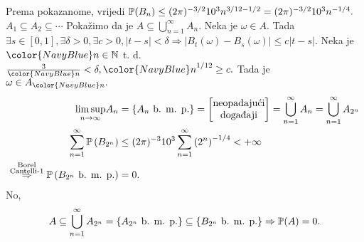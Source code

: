 \documentclass{article}
\begin{document}
Prema pokazanome, vrijedi \(\Bbb P(B_n)\le(2\pi)^{-3/2}10^3n^{3/12-1/2}=(2\pi)^{-3/2}10^3n^{-1/4}.\)\newline \(A_1\subseteq A_2\subseteq\cdots\) Pokažimo da je \(A\subseteq\bigcup_{n=1}^\infty A_n.\) Neka je \(\omega\in A.\) Tada \(\exists s\in[0,1],\exists\delta>0,\exists c>0,|t-s|<\delta\Rightarrow|B_t(\omega)-B_s(\omega)|\le c|t-s|.\) Neka je \({\color{NavyBlue}n}\in\Bbb N\) t. d. \(\frac3{\color{NavyBlue}n}<\delta,{\color{NavyBlue}n}^{1/12}\ge c.\) Tada je \(\omega\in A_{\color{NavyBlue}n}.\) \[\begin{aligned}\underset{n\to\infty}{\lim\sup}A_n&=\left\{A_n\text{ b. m. p.}\right\}=\begin{bmatrix}\text{neopadajući}\\\text{doga\dj{}aji}\end{bmatrix}=\bigcup_{n=1}^\infty A_n=\bigcup_{n=1}^\infty A_{2^n}\\\sum_{n=1}^\infty\Bbb P\left(B_{2^n}\right)&\le(2\pi)^{-3}10^3\sum_{n=1}^\infty\left(2^n\right)^{-1/4}<+\infty\\\overset{\substack{\text{Borel}\\\text{Cantelli-}1}}{\Rightarrow}\Bbb P\left(B_{2^n}\text{ b. m. p.}\right)&=0.\end{aligned}\] No, \[A\subseteq\bigcup_{n=1}^\infty A_{2^n}=\left\{A_{2^n}\text{ b. m. p.}\right\}\subseteq\left\{B_{2^n}\text{ b. m. p.}\right\}\Rightarrow\Bbb P(A)=0.\]
\end{document}
